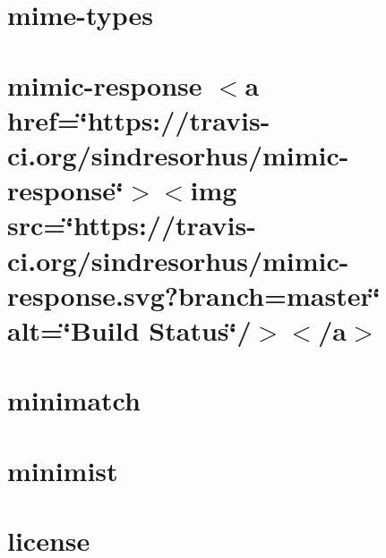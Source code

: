 \let\mypdfximage\pdfximage\def\pdfximage{\immediate\mypdfximage}\documentclass[twoside]{book}
\newcommand{\+}{\discretionary{\mbox{\scriptsize$\hookleftarrow$}}{}{}}
\begin{document}
\chapter{mime-\/types}
\label{md__c_1__git_hub__p_r_o_y_e_c_t_o-_i_i_i-_g_o_t_rest-api-node-mysql_node_modules_mime-types__r_e_a_d_m_e}

\chapter{mimic-\/response $<$a href=\char`\"{}https\+://travis-\/ci.\+org/sindresorhus/mimic-\/response\char`\"{}$>$$<$img src=\char`\"{}https\+://travis-\/ci.\+org/sindresorhus/mimic-\/response.\+svg?branch=master\char`\"{} alt=\char`\"{}\+Build Status\char`\"{}/$>$$<$/a$>$}
\label{md__c_1__git_hub__p_r_o_y_e_c_t_o-_i_i_i-_g_o_t_rest-api-node-mysql_node_modules_mimic-response_readme}

\chapter{minimatch}
\label{md__c_1__git_hub__p_r_o_y_e_c_t_o-_i_i_i-_g_o_t_rest-api-node-mysql_node_modules_minimatch__r_e_a_d_m_e}

\chapter{minimist}
\label{md__c_1__git_hub__p_r_o_y_e_c_t_o-_i_i_i-_g_o_t_rest-api-node-mysql_node_modules_minimist_readme}

\chapter{license}
\label{md__c_1__git_hub__p_r_o_y_e_c_t_o-_i_i_i-_g_o_t_rest-api-node-mysql_node_modules_ms_license}

\end{document}
